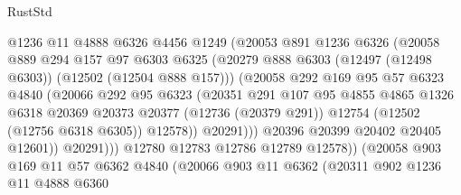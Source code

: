 \begin{lexlean}{RustStd}
\begin{coremodule}
                          @1236
                          @11
                          @4888
                          @6326
                          @4456
                          @1249
                          (@20053
                            @891
                            @1236
                            @6326
                            (@20058
                              @889
                              @294
                              @157
                              @97
                              @6303
                              @6325
                              (@20279
                                @888
                                @6303
                                (@12497 (@12498 @6303))
                                (@12502 (@12504 @888 @157)))
                              (@20058
                                @292
                                @169
                                @95
                                @57
                                @6323
                                @4840
                                (@20066
                                  @292
                                  @95
                                  @6323
                                  (@20351
                                    @291
                                    @107
                                    @95
                                    @4855
                                    @4865
                                    @1326
                                    @6318
                                    @20369
                                    @20373
                                    @20377
                                    (@12736 (@20379 @291))
                                    @12754
                                    (@12502 (@12756 @6318 @6305))
                                    @12578))
                                @20291)))
                          @20396
                          @20399
                          @20402
                          @20405
                          @12601))
                      @20291)))
                @12780
                @12783
                @12786
                @12789
                @12578))
            (@20058
              @903
              @169
              @11
              @57
              @6362
              @4840
              (@20066
                @903
                @11
                @6362
                (@20311
                  @902
                  @1236
                  @11
                  @4888
                  @6360

\end{coremodule}
\end{lexlean}
